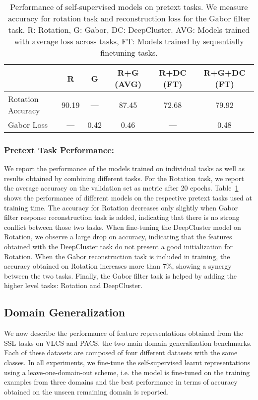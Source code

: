 \documentclass[runningheads]{llncs}
\begin{document}
\begin{table}[t]
\caption{Performance of self-supervised models on pretext tasks. We measure accuracy for rotation task and reconstruction loss for the Gabor filter task. R: Rotation, G: Gabor, DC: DeepCluster. AVG: Models trained with average loss across tasks, FT: Models trained by sequentially finetuning tasks.}
\centering
\begin{tabular}{l|c|c|c|c|c}
\hline
& R & G & R+G (AVG) & R+DC (FT)   & R+G+DC (FT) \\ \hline
Rotation Accuracy & 90.19        & ---   & 87.45    & 72.68   & 79.92   \\
Gabor Loss  &   ---          & 0.42   & 0.46   & ---   & 0.48        \\ \hline
\end{tabular}
\label{tab:pretext}
\end{table}
\vspace{-5pt}\subsubsection{Pretext Task Performance:} We report the performance of the models trained on individual tasks as well as results obtained by combining different tasks. For the Rotation task, we report the average accuracy on the validation set as metric after 20 epochs. 
Table~\ref{tab:pretext} shows the performance of different models on the respective pretext tasks used at training time. The accuracy for Rotation decreases only slightly when  Gabor filter response reconstruction task is added, indicating that there is no strong conflict between those two tasks. When fine-tuning the DeepCluster model on Rotation, we observe a large drop on accuracy, indicating that the features obtained with the DeepCluster task do not present a good initialization for Rotation. When the Gabor reconstruction task is included in training, the accuracy obtained on Rotation increases more than $7\%$, showing a synergy between the two tasks. Finally, the Gabor filter task is helped by adding the higher level tasks: Rotation and DeepCluster.




\subsection{Domain Generalization}
We now describe the performance of feature representations obtained from the SSL tasks on VLCS and PACS, the two main domain generalization benchmarks. Each of these datasets are composed of four different datasets with the same classes. In all experiments, we fine-tune the self-supervised learnt representations using a leave-one-domain-out scheme, i.e.  the model is fine-tuned on the training examples from three domains and the best performance in terms of accuracy obtained on the unseen remaining domain is reported.
\end{document}
